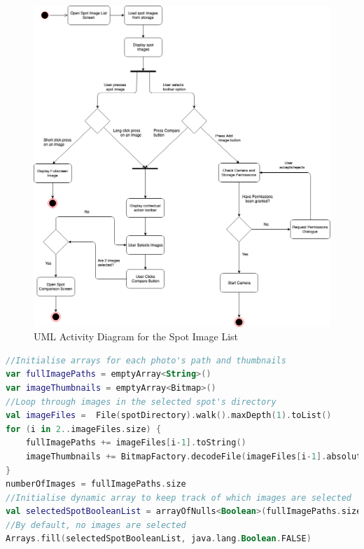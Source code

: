 
\begin{figure}
    \includegraphics[width=1.2\textwidth, center]{figures/SpotImageList.png}
    \caption{UML Activity Diagram for the Spot Image List}
    \label{fig:SpotImageList}
\end{figure}
\begin{lstlisting}[caption={Loading spot images to compare}, label={lst:loadingspotimages}, language=Kotlin]
//Initialise arrays for each photo's path and thumbnails
var fullImagePaths = emptyArray<String>()
var imageThumbnails = emptyArray<Bitmap>()
//Loop through images in the selected spot's directory
val imageFiles =  File(spotDirectory).walk().maxDepth(1).toList()
for (i in 2..imageFiles.size) {
    fullImagePaths += imageFiles[i-1].toString()
    imageThumbnails += BitmapFactory.decodeFile(imageFiles[i-1].absolutePath)
}
numberOfImages = fullImagePaths.size
//Initialise dynamic array to keep track of which images are selected
val selectedSpotBooleanList = arrayOfNulls<Boolean>(fullImagePaths.size)
//By default, no images are selected 
Arrays.fill(selectedSpotBooleanList, java.lang.Boolean.FALSE)
\end{lstlisting}

